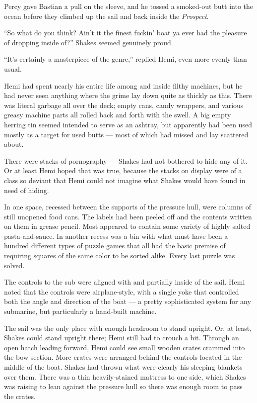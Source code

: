 \documentclass[
]{scrbook}
\begin{document}
Percy gave Bastian a pull on the sleeve, and he tossed a smoked-out butt
into the ocean before they climbed up the sail and back inside the
\emph{Prospect}.

\bigskip

``So what do you think? Ain't it the finest fuckin' boat ya ever had the
pleasure of dropping inside of?'' Shakes seemed genuinely proud.

``It's certainly a masterpiece of the genre,'' replied Hemi, even more
evenly than usual.

Hemi had spent nearly his entire life among and inside filthy machines,
but he had never seen anything where the grime lay down quite as thickly
as this. There was literal garbage all over the deck; empty cans, candy
wrappers, and various greasy machine parts all rolled back and forth
with the swell. A big empty herring tin seemed intended to serve as an
ashtray, but apparently had been used mostly as a target for used butts
--- most of which had missed and lay scattered about.

There were stacks of pornography --- Shakes had not bothered to hide any
of it. Or at least Hemi hoped that was true, because the stacks on
display were of a class so deviant that Hemi could not imagine what
Shakes would have found in need of hiding.

In one space, recessed between the supports of the pressure hull, were
columns of still unopened food cans. The labels had been peeled off and
the contents written on them in grease pencil. Most appeared to contain
some variety of highly salted pasta-and-sauce. In another recess was a
bin with what must have been a hundred different types of puzzle games
that all had the basic premise of requiring squares of the same color to
be sorted alike. Every last puzzle was solved.

The controls to the sub were aligned with and partially inside of the
sail. Hemi noted that the controls were airplane-style, with a single
yoke that controlled both the angle and direction of the boat --- a
pretty sophisticated system for any submarine, but particularly a
hand-built machine.

The sail was the only place with enough headroom to stand upright. Or,
at least, Shakes could stand upright there; Hemi still had to crouch a
bit. Through an open hatch leading forward, Hemi could see small wooden
crates crammed into the bow section. More crates were arranged behind
the controls located in the middle of the boat. Shakes had thrown what
were clearly his sleeping blankets over them. There was a thin
heavily-stained mattress to one side, which Shakes was raising to lean
against the pressure hull so there was enough room to pass the crates.
\end{document}
